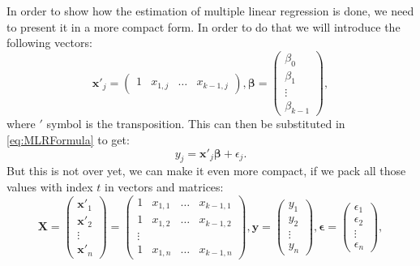 \documentclass[
]{book}
\theoremstyle{definition}
\theoremstyle{definition}
\theoremstyle{definition}
\theoremstyle{definition}
\theoremstyle{remark}
\begin{document}
In order to show how the estimation of multiple linear regression is done, we need to present it in a more compact form. In order to do that we will introduce the following vectors:
\begin{equation}
    \mathbf{x}'_j = \begin{pmatrix}1 & x_{1,j} & \dots & x_{k-1,j} \end{pmatrix},
    \boldsymbol{\beta} = \begin{pmatrix}\beta_0 \\ \beta_{1} \\ \vdots \\ \beta_{k-1} \end{pmatrix} ,
    \label{eq:MLRVectors}
\end{equation}
where \('\) symbol is the transposition. This can then be substituted in \eqref{eq:MLRFormula} to get:
\begin{equation}
    y_j = \mathbf{x}'_j \boldsymbol{\beta} + \epsilon_j .
    \label{eq:MLRFormulaCompacter}
\end{equation}
But this is not over yet, we can make it even more compact, if we pack all those values with index \(t\) in vectors and matrices:
\begin{equation}
    \mathbf{X} = \begin{pmatrix} \mathbf{x}'_1 \\ \mathbf{x}'_2 \\ \vdots \\ \mathbf{x}'_n \end{pmatrix} = 
    \begin{pmatrix} 1 & x_{1,1} & \dots & x_{k-1,1} \\ 1 & x_{1,2} & \dots & x_{k-1,2} \\ \vdots \\ 1 & x_{1,n} & \dots & x_{k-1,n} \end{pmatrix}, 
    \mathbf{y} = \begin{pmatrix} y_1 \\ y_2 \\ \vdots \\ y_n \end{pmatrix}, 
    \boldsymbol{\epsilon} = \begin{pmatrix} \epsilon_1 \\ \epsilon_2 \\ \vdots \\ \epsilon_n \end{pmatrix} ,
    \label{eq:MLRMatrices}
\end{equation}
\end{document}
